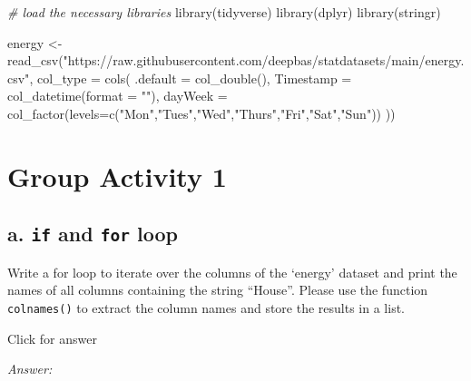 \documentclass[
]{book}
\newenvironment{Shaded}{\begin{snugshade}}{\end{snugshade}}
\newcommand{\AttributeTok}[1]{\textcolor[rgb]{0.77,0.63,0.00}{#1}}
\newcommand{\CommentTok}[1]{\textcolor[rgb]{0.56,0.35,0.01}{\textit{#1}}}
\newcommand{\FunctionTok}[1]{\textcolor[rgb]{0.00,0.00,0.00}{#1}}
\newcommand{\NormalTok}[1]{#1}
\newcommand{\OtherTok}[1]{\textcolor[rgb]{0.56,0.35,0.01}{#1}}
\newcommand{\StringTok}[1]{\textcolor[rgb]{0.31,0.60,0.02}{#1}}
\begin{document}
\begin{Shaded}
\begin{Highlighting}[]
\CommentTok{\# load the necessary libraries}
\FunctionTok{library}\NormalTok{(tidyverse)}
\FunctionTok{library}\NormalTok{(dplyr)}
\FunctionTok{library}\NormalTok{(stringr)}


\NormalTok{energy }\OtherTok{\textless{}{-}} \FunctionTok{read\_csv}\NormalTok{(}\StringTok{"https://raw.githubusercontent.com/deepbas/statdatasets/main/energy.csv"}\NormalTok{,}
                    \AttributeTok{col\_type =} \FunctionTok{cols}\NormalTok{(}
                     \AttributeTok{.default =} \FunctionTok{col\_double}\NormalTok{(), }
                      \AttributeTok{Timestamp =} \FunctionTok{col\_datetime}\NormalTok{(}\AttributeTok{format =} \StringTok{""}\NormalTok{),}
                      \AttributeTok{dayWeek =} \FunctionTok{col\_factor}\NormalTok{(}\AttributeTok{levels=}\FunctionTok{c}\NormalTok{(}\StringTok{"Mon"}\NormalTok{,}\StringTok{"Tues"}\NormalTok{,}\StringTok{"Wed"}\NormalTok{,}\StringTok{"Thurs"}\NormalTok{,}\StringTok{"Fri"}\NormalTok{,}\StringTok{"Sat"}\NormalTok{,}\StringTok{"Sun"}\NormalTok{))}
\NormalTok{                     ))}
\end{Highlighting}
\end{Shaded}

\hypertarget{group-activity-1-2}{%
\section{Group Activity 1}\label{group-activity-1-2}}

\hypertarget{a.-if-and-for-loop}{%
\subsection{\texorpdfstring{a. \texttt{if} and \texttt{for} loop}{a. if and for loop}}\label{a.-if-and-for-loop}}

Write a for loop to iterate over the columns of the `energy' dataset and print the names of all columns containing the string ``House''. Please use the function \texttt{colnames()} to extract the column names and store the results in a list.

Click for answer

\emph{Answer:}
\end{document}
